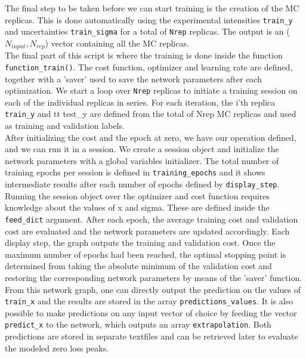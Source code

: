 The final step to be taken before we can start training is the creation of the MC replicas.
%
This is done automatically using the experimental intensities {\tt train\_y} and uncertainties
{\tt train\_sigma} for a total of {\tt Nrep} replicas. The output is an ($N_{input}, N_{rep}$) 
vector containing all the MC replicas. \\

The final part of this script is where the training is done inside the function {\tt function_train()}. 
%
The cost function, optimizer and learning rate are defined, together with a 'saver' used to 
save the network parameters after each optimization. 
%
We start a loop over {\tt Nrep} replicas to initiate a training session on each of the individual replicas
in series. 
%
For each iteration, the i'th replica {\tt train\_y} and {tt test\_y} are defined from the total of Nrep 
MC replicas and used as training and validation labels. 
%
\\

After initializing the cost and the epoch at zero, we have our operation defined, and we can run it in a session. 
%
We create a session object and initialize the network parameters with a global variables initializer.
%
The total number of training epochs per session is defined in {\tt training\_epochs} and it shows intermediate 
results after each number of epochs defined by {\tt display\_step}. 
%
Running the session object over the optimizer and cost function requires knowledge about the values of x and sigma. 
These are defined inside the {\tt feed_dict} argument. 
%
After each epoch, the average training cost and validation cost are evaluated and the network parameters 
are updated accordingly.
%
Each display step, the graph outputs the training and validation cost. Once the maximum number of epochs 
had been reached, the optimal stopping point is determined from taking the absolute minimum of the validation cost
and restoring the corresponding network parameters by means of the 'saver' function.
%
From this network graph, one can directly output the prediction on the values of {\tt train\_x} and
the results are stored in the array {\tt predictions\_values}.
%
It is also possible to make predictions on any input vector of choice by feeding the vector {\tt predict\_x} to the 
network, which outputs an array {\tt extrapolation}.
%
Both predictions are stored in separate textfiles and can be retrieved later to evaluate the modeled zero loss peaks.




